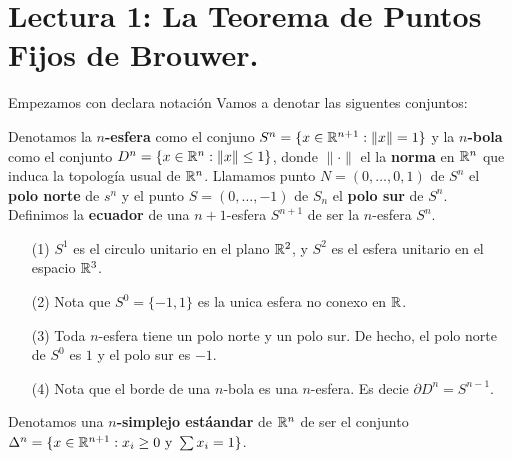 \section*{Lectura 1: La Teorema de Puntos Fijos de Brouwer.}

Empezamos con declara notaci\'on Vamos a denotar las siguentes conjuntos:

\begin{definition}
    Denotamos la \textbf{$n$-esfera} como el conjuno $S^n=\{x \in
    \mathbb{R}^{n+1} : \|x\|=1\}$ y la \textbf{$n$-bola} como el conjunto $D^n=\{x
    \in \mathbb{R}^{n} : \|x\| \leq 1\}$, donde $\|\cdot\|$ el la \textbf{norma} en
    $\mathbb{R}^n$ que induca la topolog\'ia usual de $\mathbb{R}^n$. Llamamos punto
    $N=(0,\dots,0,1)$ de $S^n$ el \textbf{polo norte} de $s^n$ y el punto $S=(0,
    \dots, -1)$ de $S_n$ el  \textbf{polo sur} de $S^n$. Definimos la
    \textbf{ecuador} de una $n+1$-esfera $S^{n+1}$ de ser la $n$-esfera $S^n$.
\end{definition}

\begin{example}\label{exmp_1}
    \begin{enumerate}
        \item[(1)] $S^1$ es el circulo unitario en el plano $\mathbb{R}^2$, y  $S^2$ es
            el esfera unitario en el espacio $\mathbb{R}^3$.

        \item[(2)] Nota que $S^0=\{-1,1\}$ es la unica esfera no conexo en $\mathbb{R}$.

        \item[(3)] Toda $n$-esfera tiene un polo norte y un polo sur. De hecho,
            el polo norte de $S^0$ es $1$ y el polo sur es $-1$.

        \item[(4)] Nota que el borde de una $n$-bola es una  $n$-esfera. Es
            decie  $\partial{D^n}=S^{n-1}$.
    \end{enumerate}
\end{example}

\begin{definition}
    Denotamos una \textbf{$n$-simplejo est\'aandar} de $\mathbb{R}^n$ de ser el conjunto
    $\Delta^n=\{x \in \mathbb{R}^{n+1} : x_i \geq 0 \text{ y } \sum{x_i}=1\}$.
\end{definition}

